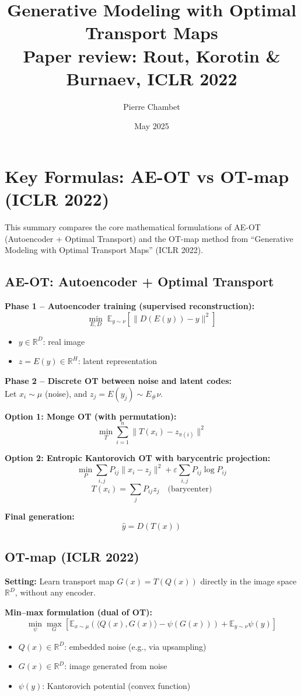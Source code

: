 \documentclass[11pt]{article}
\title{\textbf{Generative Modeling with Optimal Transport Maps}\\[0.3em]\large Paper review: Rout, Korotin \& Burnaev, ICLR 2022}
\author{Pierre Chambet}
\date{May 2025}
\begin{document}
\maketitle

\section*{Key Formulas: AE-OT vs OT-map (ICLR 2022)}

This summary compares the core mathematical formulations of AE-OT (Autoencoder + Optimal Transport) and the OT-map method from ``Generative Modeling with Optimal Transport Maps'' (ICLR 2022).

\subsection*{\textbf{AE-OT: Autoencoder + Optimal Transport}}

\textbf{Phase 1 – Autoencoder training (supervised reconstruction):}
\[
\min_{E, D} \; \mathbb{E}_{y \sim \nu} \left[ \| D(E(y)) - y \|^2 \right]
\]
\begin{itemize}
    \item $y \in \mathbb{R}^D$: real image
    \item $z = E(y) \in \mathbb{R}^H$: latent representation
\end{itemize}

\textbf{Phase 2 – Discrete OT between noise and latent codes:} \\
Let $x_i \sim \mu$ (noise), and $z_j = E(y_j) \sim E_\# \nu$.

\textbf{Option 1: Monge OT (with permutation):}
\[
\min_T \sum_{i=1}^n \| T(x_i) - z_{\pi(i)} \|^2
\]

\textbf{Option 2: Entropic Kantorovich OT with barycentric projection:}
\[
\min_P \sum_{i,j} P_{ij} \| x_i - z_j \|^2 + \varepsilon \sum_{i,j} P_{ij} \log P_{ij}
\]
\[
T(x_i) = \sum_j P_{ij} z_j \quad \text{(barycenter)}
\]

\textbf{Final generation:}
\[
\hat{y} = D(T(x))
\]

\subsection*{\textbf{OT-map (ICLR 2022)}}

\textbf{Setting:} Learn transport map $G(x) = T(Q(x))$ directly in the image space $\mathbb{R}^D$, without any encoder.

\textbf{Min--max formulation (dual of OT):}
\[
\min_{\psi} \max_{G} \left[ \mathbb{E}_{x \sim \mu} \left( \langle Q(x), G(x) \rangle - \psi(G(x)) \right) + \mathbb{E}_{y \sim \nu} \psi(y) \right]
\]
\begin{itemize}
    \item $Q(x) \in \mathbb{R}^D$: embedded noise (e.g., via upsampling)
    \item $G(x) \in \mathbb{R}^D$: image generated from noise
    \item $\psi(y)$: Kantorovich potential (convex function)
\end{itemize}
\end{document}
